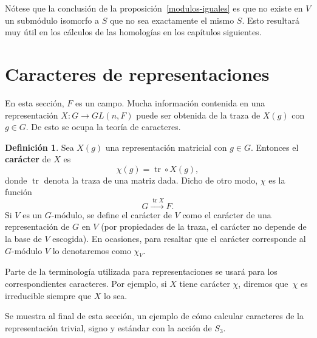 \documentclass[12pt]{book}
\theoremstyle{definition}
\newtheorem{definition}[theorem]{Definición}
\DeclareMathOperator{\tr}{tr}
\newcounter{in}
\newcounter{ini}
\begin{document}
Nótese que la conclusión de la proposición~\ref{modulos-iguales} es
que no existe en $V$ un submódulo isomorfo a $S$ que no sea
exactamente el mismo $S$. Esto resultará muy útil en los cálculos de
las homologías en los capítulos siguientes.

\section{Caracteres de representaciones}
\label{caracteres}

En esta sección, $F$ es un campo. Mucha información contenida en una representación $X:G\rightarrow
GL(n,F)$ puede ser obtenida de la traza de $X(g)$ con $g\in G$. De
esto se ocupa la teoría de caracteres.

\begin{definition}
  Sea $X(g)$ una representación matricial con $g\in G$. Entonces el \textbf{carácter} de $X$ es
  \begin{equation*}
    \chi(g)=\tr \circ X(g),
  \end{equation*}
  donde $\tr$ denota la traza de una matriz dada. Dicho de otro modo,
  $\chi$ es la función
\begin{equation*}
  G\stackrel{\tr X}{\rightarrow}F.
\end{equation*}
Si $V$ es un $G$-módulo, se define el carácter de $V$ como el carácter de una
representación de $G$ en $V$ (por propiedades de
la traza, el carácter no depende de la base de $V$ escogida). En ocasiones, para resaltar
que el carácter corresponde al $G$-módulo $V$ lo denotaremos como $\chi_{V}$.
\end{definition}

Parte de la terminología utilizada para representaciones se
usará para los correspondientes caracteres. Por ejemplo, si $X$ tiene
carácter $\chi$, diremos que~$\chi$ es irreducible siempre que $X$ lo
sea.

Se muestra al final de esta sección, un ejemplo de cómo calcular caracteres de la representación
trivial, signo y estándar con la acción de $S_{3}$.
\end{document}
